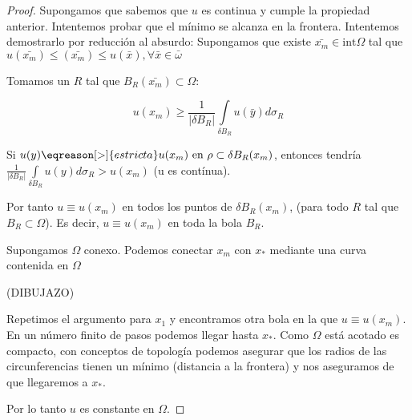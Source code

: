 		\begin{proof}

			Supongamos que sabemos que $u$ es continua y cumple la propiedad anterior. Intentemos probar que el mínimo se alcanza en la frontera. Intentemos demostrarlo por reducción al absurdo: Supongamos que existe $\bar{x_m} \in \text{int} \Omega$ tal que $u(\bar{x_m}) \leq (\bar{x_m}) \leq u(\bar{x}), \forall \bar{x} \in \bar{\omega}$

			Tomamos un $R$ tal que $B_R (\bar{x_m}) \subset \Omega$:

			\[ u(x_m) \geq \frac{1}{|\delta B_R|}  \int\limits_{\delta B_R} u(\bar{y}) d \sigma_R \]

			Si $u(y) \eqreason[>]{estricta} u(x_m) \text{ en } \rho \subset \delta B_R (x_m)$, entonces tendría $\frac{1}{|\delta B_R|} \int\limits_{\delta B_R} u(y) d \sigma_R > u(x_m) $ (u es contínua).

			Por tanto $u \equiv u(x_m)$ en todos los puntos de $\delta B_R(x_m)$, (para todo $R$ tal que $B_R \subset \Omega$). Es decir, $u \equiv u(x_m)$ en toda la bola $B_R$.

			Supongamos $\Omega$ conexo. Podemos conectar $x_m$ con $x_*$ mediante una curva contenida en $\Omega$

			(DIBUJAZO)

			Repetimos el argumento para $x_1$ y encontramos otra bola en la que $u \equiv u(x_m)$. En un número finito de pasos podemos llegar hasta $x_*$. Como $\Omega$ está acotado es compacto, con conceptos de topología podemos asegurar que los radios de las circunferencias tienen un mínimo (distancia a la frontera) y nos aseguramos de que llegaremos a $x_*$.

			Por lo tanto $u$ es constante en $\Omega$.

		\end{proof}

